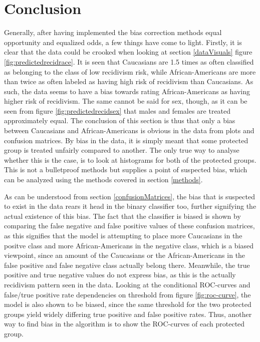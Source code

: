 \documentclass[11pt, fleqn, titlepage]{article}
\begin{document}
	\section{Conclusion} \label{conclusion}
	Generally, after having implemented the bias correction methods equal opportunity and equalized odds, a few things have come to light. Firstly, it is clear that the data could be crooked when looking at section \ref{dataVisuals} figure \ref{fig:predictedrecidrace}. It is seen that Caucasians are 1.5 times as often classified as belonging to the class of low recidivism risk, while African-Americans are more than twice as often labeled as having high risk of recidivism than Caucasians. As such, the data seems to have a bias towards rating African-Americans as having higher risk of recidivism. The same cannot be said for sex, though, as it can be seen from figure \ref{fig:predictedrecidsex} that males and females are treated approximately equal. The conclusion of this section is thus that only a bias between Caucasians and African-Americans is obvious in the data from plots and confusion matrices. By bias in the data, it is simply meant that some protected group is treated unfairly compared to another. The only true way to analyse whether this is the case, is to look at histograms for both of the protected groups. This is not a bulletproof methods but supplies a point of suspected bias, which can be analyzed using the methods covered in section \ref{methods}.
	
	As can be understood from section \ref{confusionMatrices}, the bias that is suspected to exist in the data rears it head in the binary classifier too, further signifying the actual existence of this bias. The fact that the classifier is biased is shown by comparing the false negative and false positive values of these confusion matrices, as this signifies that the model is attempting to place more Caucasians in the positve class and more African-Americans in the negative class, which is a biased viewpoint, since an amount of the Caucasians or the African-Americans in the false positive and false negative class actually belong there. Meanwhile, the true positive and true negative values do not express bias, as this is the actually recidivism pattern seen in the data. Looking at the conditional ROC-curves and false/true positive rate dependencies on threshold from figure \ref{fig:roc-curve}, the model is also shown to be biased, since the same threshold for the two protected groups yield widely differing true positive and false positive rates. Thus, another way to find bias in the algorithm is to show the ROC-curves of each protected group.
	
\end{document}
